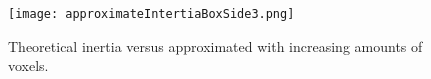  \begin{figure}[H]
   \centering
   \texttt{[image: approximateIntertiaBoxSide3.png]}
   \caption{Theoretical inertia versus approximated with increasing amounts of voxels.}
   \label{fig:appInertia}
 \end{figure}

%
